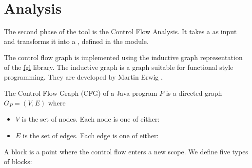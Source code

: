 \section{Analysis}
The second phase of the tool is the Control Flow Analysis. It takes a 
 as input and transforms it into a 
, defined in the  module.

The control flow graph is implemented using the inductive graph representation
of the \href{http://hackage.haskell.org/package/fgl}{fgl} library. The inductive
graph is a graph suitable for functional style programming. They are developed
by Martin Erwig \cite{erwig2001inductive}.

\begin{definition}
The Control Flow Graph (CFG) of a Java program $P$ is a directed graph $G_P=(V,E)$
where

\begin{itemize}
    \item $V$ is the set of nodes. Each node is one of either:
    \item $E$ is the set of edges. Each edge is one of either:
\end{itemize}
\end{definition}

A block is a point where the control flow enters a new scope. We define five 
types of blocks:


